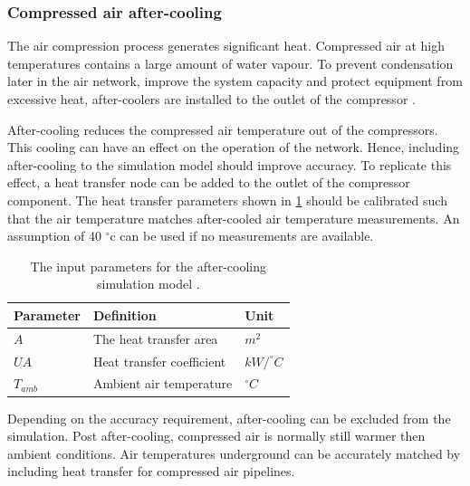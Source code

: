 		\subsubsection{Compressed air after-cooling}
		The air compression process generates significant heat. Compressed air at high temperatures contains a large amount of water vapour. To prevent condensation later in the air network, improve the system capacity and protect equipment from excessive heat, after-coolers are installed to the outlet of the compressor \cite{schroeder2009energy}.
		\par 
		After-cooling reduces the compressed air temperature out of the compressors. This cooling can have an effect on the operation of the network. Hence, including after-cooling to the simulation model should improve accuracy. 
		To replicate this effect, a heat transfer node can be added to the outlet of the compressor component. The heat transfer parameters shown in \cref{table: After cooling inputs} should be calibrated such that the air temperature matches after-cooled air temperature measurements. An assumption of 40 $^\circ$\gls{c} can be used if no measurements are available.
		\begin{table}
			\centering
			\begin{tabular}{lll}
				\hline 
				Parameter \hspace{1cm} & Definition \hspace{4cm} & Unit \\
				\hline
				$A$ & The heat transfer area & $m^2$ \\
				$UA$ & Heat transfer coefficient & $kW/^{\circ} C$ \\
				$T_{amb}$ & Ambient air temperature & $^{\circ} C$ \\
				\hline
			\end{tabular}
		\caption{The input parameters for the after-cooling simulation model .}
		\label{table: After cooling inputs}
		\end{table}
	Depending on the accuracy requirement, after-cooling can be excluded from the simulation. Post after-cooling, compressed air is normally still warmer then ambient conditions. Air temperatures underground can be accurately matched by including heat transfer for compressed air pipelines.
